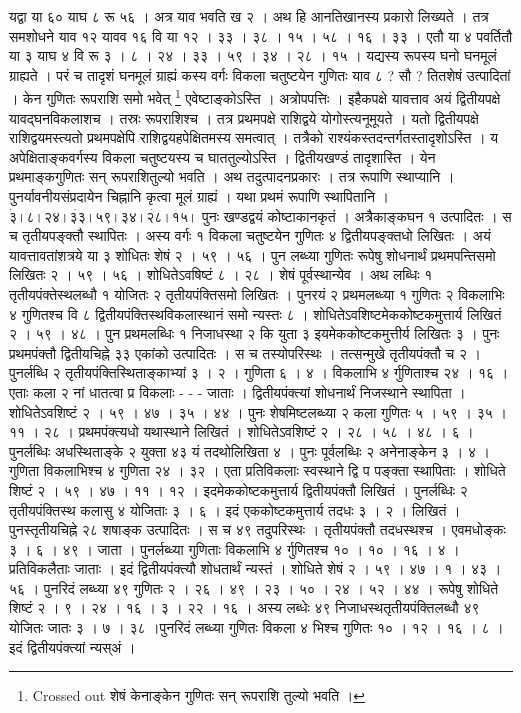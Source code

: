 \documentclass[11pt,a5paper]{book}
\begin{document}
{यद्वा या ६० याघ ८ रू ५६ । अत्र याव भवति ख २ । अथ हि आनतिखानस्य प्रकारो लिख्यते । तत्र समशोधने याव १२ यावव १६ वि या १२ । ३३ । ३८ । १५ । ५८ । १६ । ३३ । एतौ या ४ पवर्तितौ या ३ याघ ४ वि रू ३ । ८ । २४ । ३३ । ५९ । ३४ । २८ । १५ । यद्यस्य रूपस्य घनो घनमूलं ग्राह्यते । परं च तादृशं घनमूलं ग्राह्यं कस्य वर्गः विकला चतुष्टयेन गुणितः याव ८ ? सौ ? तितशेषं उत्पादितां । केन गुणितः रूपराशि समो भवेत् \footnote{Crossed out शेषं केनाङ्केन गुणितः सन् रूपराशि तुल्यो भवति ।} एवेष्टाङ्कोऽस्ति । अत्रोपपत्तिः । इहैकपक्षे यावत्ताव अयं द्वितीयपक्षे यावद्घनविकलाशच । तस्रः रूपराशिश्च । तत्र प्रथमपक्षे राशिद्वये योगोस्त्यनूमूयते । यतो द्वितीयपक्षे राशिद्वयमस्त्यतो प्रथमपक्षेपि राशिद्वयहपेक्षितमस्य समत्वात् । तत्रैको राश्यंकस्तदन्तर्गतस्तादृशोऽस्ति । य अपेक्षिताङ्कवर्गस्य विकला चतुष्टयस्य च घाततुल्योऽस्ति । द्वितीयखण्डं तादृशास्ति । येन प्रथमाङ्कगुणितः सन् रूपराशितुल्यो भवति । अथ तदुत्पादनप्रकारः । तत्र रूपाणि स्थाप्यानि । पुनर्यावनीयसंप्रदायेन चिह्नानि कृत्वा मूलं ग्राह्यं । यथा प्रथमं रूपाणि स्थापितानि । $\dot{३} । ८ । २४ । \dot{३३} । ५९ । ३४ । \dot{२८} । १५ ।$ पुनः खण्डद्वयं कोष्टाकानकृतं । अत्रैकाङ्कघन १ उत्पादितः । स च तृतीयपङ्क्तौ स्थापितः । अस्य वर्गः १ विकला चतुष्टयेन गुणितः ४ द्वितीयपङ्क्तधो लिखितः । अयं यावत्तावतांशत्रये या ३ शोधितः शेषं २ । ५९ । ५६ । पुन लब्ध्या गुणितः रूपेषु शोधनार्थं प्रथमपन्तिसमो लिखितः २ । ५९ । ५६ । शोधितेऽवषिष्टं ८ । २८ । शेषं पूर्वस्थान्येव । अथ लब्धिः १ तृतीयपंक्तेस्थलब्धौ १ योजितः २ तृतीयपंक्तिसमो लिखितः । पुनरयं २ प्रथमलब्ध्या १ गुणितः २ विकलाभिः ४ गुणितश्च  वि ८ द्वितीयपंक्तिस्थविकलास्थानं समो न्यस्तः ८ । शोधितेऽवशिष्टमेककोष्टकमुत्तार्य लिखितं २ । ५९ । ४८ । पुन प्रथमलब्धिः १ निजाधस्था २ कि युता ३ इयमेककोष्टकमुत्तीर्य लिखितः ३ । पुनः प्रथमपंक्तौ द्वितीयचिह्ने ३३ एकांको उत्पादितः । स च तस्योपरिस्थः । तत्सन्मुखे तृतीयपंक्तौ च २ । पुनर्लब्धि २ तृतीयपंक्तिस्थिताङ्काभ्यां ३ । २ । गुणिता ६ । ४ । विकलाभि ४ र्गुणिताश्च २४ । १६ । एताः कला २ नां धातत्वा प्र विकलाः - - - जाताः । द्वितीयपंक्त्यां शोधनार्थं निजस्थाने स्थापिता । शोधितेऽवशिष्टं २ । ५९ । ४७ । ३५ । ४४ । पुनः शेषमिष्टलब्ध्या २ कला गुणितः ५ । ५९ । ३५ । ११ । २८ । प्रथमपंक्त्यधो यथास्थाने लिखितं । शोधितेऽवशिष्टं २ । २८ । ५८ । ४८ । ६ । पुनर्लब्धिः अधस्थिताङ्के २ युक्ता ४३ यं तदथोलिखिता ४ । पुनः पूर्वलब्धिः २ अनेनाङ्केन ३ । ४ । गुणिता विकलाभिश्च ४ गुणिता २४ । ३२ । एता प्रतिविकलाः स्वस्थाने द्वि प पङ्क्ता स्थापिताः । शोधिते शिष्टं २ । ५९ । ४७ । ११ । १२ । इदमेककोष्टकमुत्तार्य द्वितीयपंक्तौ लिखितं । पुनर्लब्धिः २ तृतीयपंक्तिस्थ कलासु ४ योजिताः ३ । ६ । इदं एककोष्टकमुत्तार्य तदधः ३ । २ । लिखितं । पुनस्तृतीयचिह्ने २८ शषाङ्क उत्पादितः । स च ४९ तदुपरिस्थः । तृतीयपंक्तौ तदधस्थश्च । एवमधोङ्कः ३ । ६ । ४९ । जाता । पुनर्लब्ध्या गुणिताः विकलाभि ४ र्गुणितश्च १० । १० । १६ । ४ । प्रतिविकलैताः जाताः । इदं द्वितीयपंक्त्यौ शोधतार्थं न्यस्तं । शोधिते शेषं २ । ५९ । ४७ । १ । ४३ । ५६ । पुनरिदं लब्ध्या ४९ गुणितः २ । २६ । ४९ । २३ । ५० । २४ । ५२ । ४४ । रूपेषु शोधिते शिष्टं २ । ९ । २४ । १६ । ३ । २२ । १६ । अस्य लब्धेः ४९ निजाधस्थतृतीयपंक्तिलब्धौ ४९ योजितः जातः ३ । ७ । ३८ ।पुनरिदं लब्ध्या गुणितः विकला ४ भिश्च गुणितः १० । १२ । १६ । ८ । इदं द्वितीयपंक्त्यां न्यस्अं । 




}
\end{document}
